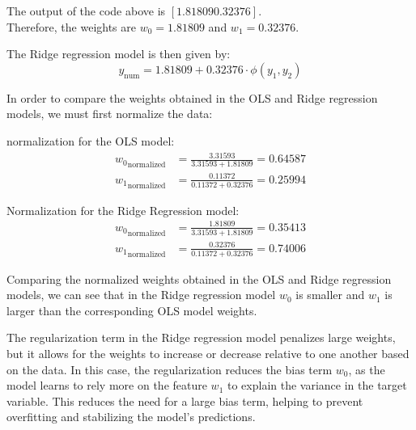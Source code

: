 \documentclass[12pt]{article}
\begin{document}
\begin{enumerate}
    \vspace{10pt}
    

    \vspace{10pt}
    The output of the code above is $[1.81809 0.32376]$.\\
    Therefore, the weights are $w_0 = 1.81809$ and $w_1 = 0.32376$.

    \vspace{10pt}
    The Ridge regression model is then given by:
    \begin{equation*}
        y_\text{num} = 1.81809 + 0.32376 \cdot \phi(y_1, y_2)
    \end{equation*}

    In order to compare the weights obtained in the OLS and Ridge regression models, we must first normalize the data:

    \vspace{10pt}
    normalization for the OLS model:
    \begin{equation*}
        \begin{aligned}
            {w_0}_\text{normalized} &= \frac{3.31593}{3.31593 + 1.81809} = 0.64587 \\
            {w_1}_\text{normalized} &= \frac{0.11372}{0.11372 + 0.32376} = 0.25994
        \end{aligned}
    \end{equation*}

    \vspace{10pt}
    Normalization for the Ridge Regression model:
    \begin{equation*}
        \begin{aligned}
            {w_0}_\text{normalized} &= \frac{1.81809}{3.31593 + 1.81809} = 0.35413 \\
            {w_1}_\text{normalized} &= \frac{0.32376}{0.11372 + 0.32376} = 0.74006
        \end{aligned}
    \end{equation*}

    \vspace{10pt}
    Comparing the normalized weights obtained in the OLS and Ridge regression models, we can see that in the Ridge regression model $w_0$ is smaller and $w_1$ is larger than the corresponding OLS model weights.

    The regularization term in the Ridge regression model penalizes large weights, but it allows for the weights to increase or decrease relative to one another based on the data. In this case, the regularization reduces the bias term $w_0$, as the model learns to rely more on the feature $w_1$
    to explain the variance in the target variable. This reduces the need for a large bias term, helping to prevent overfitting and stabilizing the model's predictions.


\end{enumerate}
\end{document}
